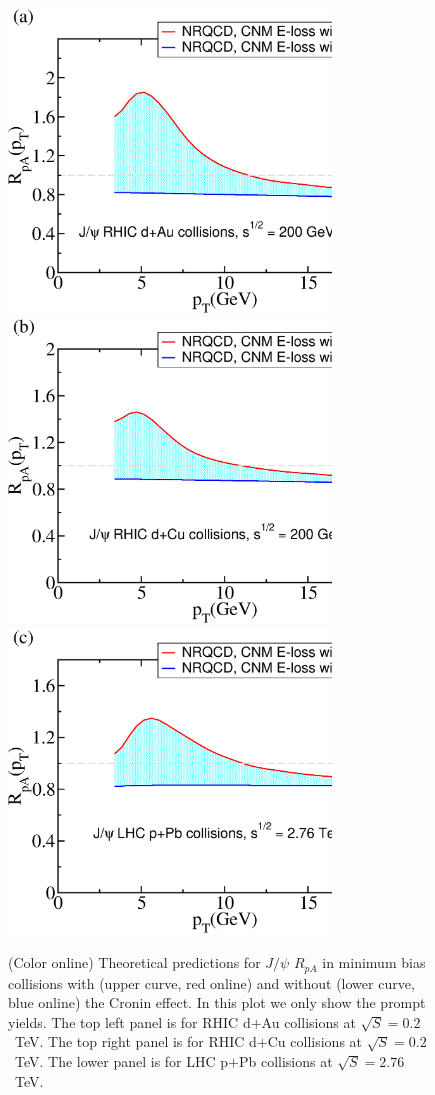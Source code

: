 \documentclass[article,showpacs,preprintnumbers,amsmath,amssymb]{revtex4}
\begin{document}
\begin{figure}[!b]
\vspace*{.2in}
\includegraphics[width=3.38in,angle=0]{fig20_rhic0200pau.eps} 
\includegraphics[width=3.38in,angle=0]{fig21_rhic0200pcu.eps} 
\includegraphics[width=3.38in,angle=0]{fig22_lhc2760ppb.eps} 
\caption{(Color online) Theoretical predictions for $J/\psi$  $R_{pA}$ in
minimum bias collisions with (upper curve, red online) and without (lower
curve, blue online) the Cronin effect. In this plot we only show the
prompt yields. The top left panel is for RHIC d$+$Au collisions at
$\sqrt{S}=0.2$~TeV. The top right panel is for RHIC d$+$Cu collisions at
$\sqrt{S}=0.2$~TeV. The lower panel is for LHC p$+$Pb collisions at
$\sqrt{S}=2.76$~TeV.~\label{fig:RpAJ1}}
\end{figure}
\end{document}
